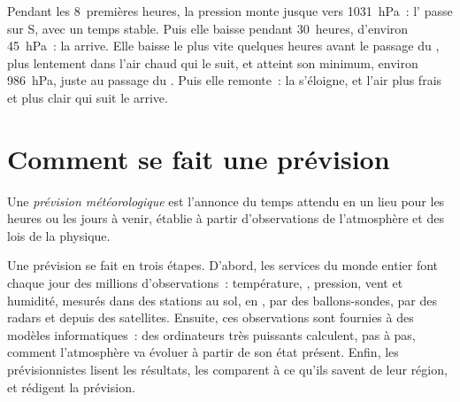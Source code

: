 \begin{example}\label{ex:g8:fronts-and-weather-maps:barogram}
Pendant les 8~premières heures, la pression monte jusque vers
\qty{1031}{hPa}~: l' passe sur S, avec un temps stable. Puis
elle baisse pendant 30~heures, d'environ \qty{45}{hPa}~: la 
arrive. Elle baisse le plus vite quelques heures avant le passage du , plus lentement dans l'air chaud qui le suit, et atteint son
minimum, environ \qty{986}{hPa}, juste au passage du . Puis
elle remonte~: la  s'éloigne, et l'air plus frais et plus clair
qui suit le  arrive.
\end{example}

\section{Comment se fait une prévision}

\begin{definition}\label{def:g8:fronts-and-weather-maps:forecast}
Une \emph{prévision météorologique}
est l'annonce du temps attendu en un lieu pour les heures ou les jours
à venir, établie à partir d'observations de l'atmosphère et des lois de la
physique.
\end{definition}

Une prévision se fait en trois étapes. D'abord, les services
 du monde entier font chaque jour des millions
d'observations~: température, , pression, vent et humidité,
mesurés dans des stations au sol, en , par des ballons-sondes, par des
radars et depuis des satellites. Ensuite, ces observations sont fournies à
des modèles informatiques~: des ordinateurs très puissants calculent, pas à
pas, comment l'atmosphère va évoluer à partir de son état présent. Enfin,
les prévisionnistes lisent les résultats, les comparent à ce qu'ils savent
de leur région, et rédigent la prévision.

